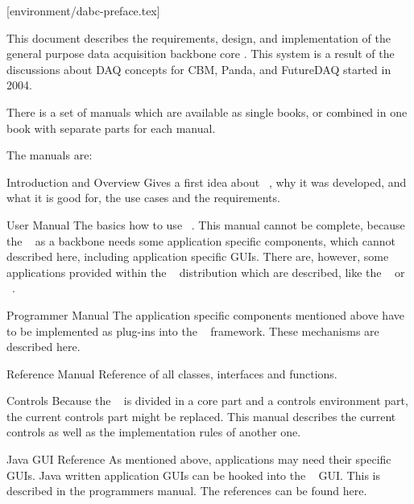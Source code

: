 [environment/dabc-preface.tex]

This document describes the requirements, design, and implementation of the
general purpose data acquisition backbone core \dabc.
This system is a result of the discussions about DAQ concepts for CBM,
Panda, and FutureDAQ started in 2004.

There is a set of manuals which are available as single books, or
combined in one book with separate parts for each manual.

The manuals are:
\begin{compactdesc}
\item [Introduction and Overview] Gives a first idea about \dabc~, 
why it was developed, and what it is good for, the use cases and the requirements.
\item [User Manual] The basics how to use \dabc~. This manual cannot be complete,
because the \dabc~ as a backbone needs some application specific components,
which cannot described here, including application specific GUIs.
There are, however, some applications provided within the \dabc~ distribution
which are described, like the \mbs~ or \ROC~.
\item [Programmer Manual] The application specific components mentioned above
have to be implemented as plug-ins into the \dabc~ framework. These mechanisms
are described here.
\item [Reference Manual] Reference of all classes, interfaces and functions.
\item [Controls] Because the \dabc~ is divided in a core part and a controls environment part,
the current controls part might be replaced. This manual describes the current controls
as well as the implementation rules of another one.
\item [Java GUI Reference] As mentioned above, applications may need their specific
GUIs. Java written application GUIs can be hooked into the \dabc~ GUI. 
This is described in the programmers manual. The references can be found here.
\end{compactdesc}
